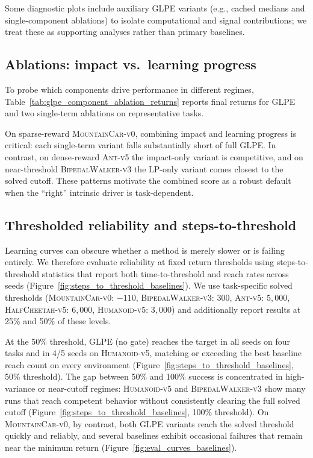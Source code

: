 Some diagnostic plots include auxiliary GLPE variants (e.g., cached medians and single-component ablations) to isolate computational and signal contributions; we treat these as supporting analyses rather than primary baselines.

\subsection{Ablations: impact vs.\ learning progress}

To probe which components drive performance in different regimes, Table~\ref{tab:glpe_component_ablation_returns} reports final returns for GLPE and two single-term ablations on representative tasks.



On sparse-reward \textsc{MountainCar-v0}, combining impact and learning progress is critical: each single-term variant falls substantially short of full GLPE.
In contrast, on dense-reward \textsc{Ant-v5} the impact-only variant is competitive, and on near-threshold \textsc{BipedalWalker-v3} the LP-only variant comes closest to the solved cutoff.
These patterns motivate the combined score as a robust default when the ``right'' intrinsic driver is task-dependent.

\subsection{Thresholded reliability and steps-to-threshold}

Learning curves can obscure whether a method is merely slower or is failing entirely.
We therefore evaluate reliability at fixed return thresholds using steps-to-threshold statistics that report both time-to-threshold and reach rates across seeds (Figure~\ref{fig:steps_to_threshold_baselines}).
We use task-specific solved thresholds (\textsc{MountainCar-v0}: $-110$, \textsc{BipedalWalker-v3}: $300$, \textsc{Ant-v5}: $5{,}000$, \textsc{HalfCheetah-v5}: $6{,}000$, \textsc{Humanoid-v5}: $3{,}000$) and additionally report results at 25\% and 50\% of these levels.



At the 50\% threshold, GLPE (no gate) reaches the target in all seeds on four tasks and in 4/5 seeds on \textsc{Humanoid-v5}, matching or exceeding the best baseline reach count on every environment (Figure~\ref{fig:steps_to_threshold_baselines}, 50\% threshold).
The gap between 50\% and 100\% success is concentrated in high-variance or near-cutoff regimes: \textsc{Humanoid-v5} and \textsc{BipedalWalker-v3} show many runs that reach competent behavior without consistently clearing the full solved cutoff (Figure~\ref{fig:steps_to_threshold_baselines}, 100\% threshold).
On \textsc{MountainCar-v0}, by contrast, both GLPE variants reach the solved threshold quickly and reliably, and several baselines exhibit occasional failures that remain near the minimum return (Figure~\ref{fig:eval_curves_baselines}).

